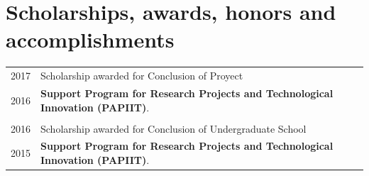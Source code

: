 \documentclass[a4paper,10pt]{article} %
\begin{document}

\section{Scholarships, awards, honors and accomplishments}
\bigskip
\begin{tabular}{r|l}
\textsc{2017} & Scholarship awarded for Conclusion of Proyect\\
\textsc{2016}&\footnotesize{\textbf{Support Program for Research Projects and Technological Innovation (PAPIIT)}.}\\
\multicolumn{2}{c}{} \\
\textsc{2016} & Scholarship awarded for Conclusion of Undergraduate School\\
\textsc{2015} &\footnotesize{\textbf{Support Program for Research Projects and Technological Innovation (PAPIIT)}.}
\end{tabular}
\bigskip

\end{document}
